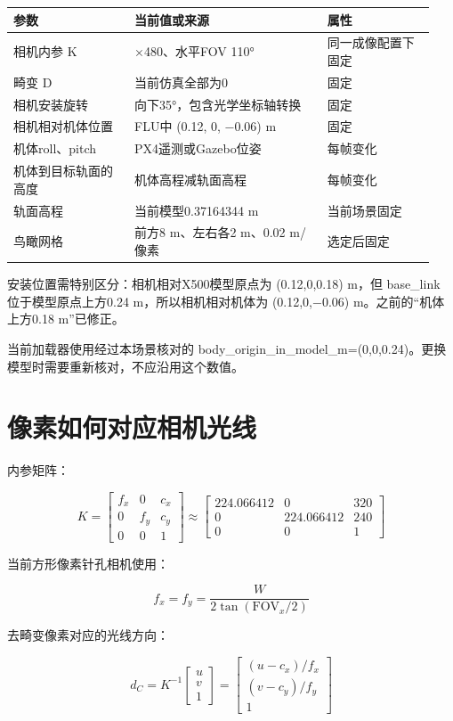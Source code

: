 \documentclass[UTF8,a4paper,11pt,fontset=windows]{ctexart}
\begin{document}
{\small\setlength{\tabcolsep}{3pt}\begin{longtable}{>{\raggedright\arraybackslash}p{0.27\linewidth}>{\raggedright\arraybackslash}p{0.43\linewidth}>{\raggedright\arraybackslash}p{0.24\linewidth}}\toprule
\textbf{参数} & \textbf{当前值或来源} & \textbf{属性}\\\midrule\endhead
相机内参 K & 640×480、水平FOV 110° & 同一成像配置下固定\\
畸变 D & 当前仿真全部为0 & 固定\\
相机安装旋转 & 向下35°，包含光学坐标轴转换 & 固定\\
相机相对机体位置 & FLU中 (0.12, 0, −0.06) m & 固定\\
机体roll、pitch & PX4遥测或Gazebo位姿 & 每帧变化\\
机体到目标轨面的高度 & 机体高程减轨面高程 & 每帧变化\\
轨面高程 & 当前模型0.37164344 m & 当前场景固定\\
鸟瞰网格 & 前方8 m、左右各2 m、0.02 m/像素 & 选定后固定\\
\bottomrule\end{longtable}}

安装位置需特别区分：相机相对X500模型原点为 (0.12,0,0.18) m，但 base\_link 位于模型原点上方0.24 m，所以相机相对机体为 (0.12,0,−0.06) m。之前的“机体上方0.18 m”已修正。


当前加载器使用经过本场景核对的 body\_origin\_in\_model\_m=(0,0,0.24)。更换模型时需要重新核对，不应沿用这个数值。


\section{像素如何对应相机光线}

内参矩阵：


\[
K=\begin{bmatrix}f_x&0&c_x\\0&f_y&c_y\\0&0&1\end{bmatrix}
\approx
\begin{bmatrix}224.066412&0&320\\0&224.066412&240\\0&0&1\end{bmatrix}
\]

当前方形像素针孔相机使用：


\[
f_x=f_y=\frac{W}{2\tan(\mathrm{FOV}_x/2)}
\]

去畸变像素对应的光线方向：


\[
d_C=K^{-1}\begin{bmatrix}u\\v\\1\end{bmatrix}
=\begin{bmatrix}(u-c_x)/f_x\\(v-c_y)/f_y\\1\end{bmatrix}
\]
\end{document}
